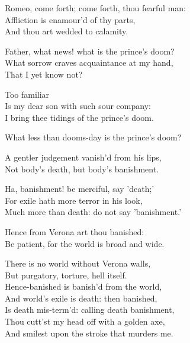  
\begin{speech}
Romeo, come forth; come forth, thou fearful man:
\\
Affliction is enamour'd of thy parts, \\
And thou art wedded to calamity.  \\
\end{speech}
\begin{speech}
Father, what news! what is the prince's doom? \\
What sorrow craves acquaintance at my hand, \\
That I yet know not? \\
\end{speech}
\begin{speech}
Too familiar \\
Is my dear son with such sour company: \\
I bring thee tidings of the prince's doom. \\
\end{speech}
\begin{speech}
What less than dooms-day is the prince's doom? \\

\end{speech}
\begin{speech}
A gentler judgement vanish'd from his lips, \\

Not body's death, but body's banishment. \\
\end{speech}
\begin{speech}
Ha, banishment! be merciful, say 'death;' \\
For exile hath more terror in his look, \\
Much more than death: do not say 'banishment.' \\
\end{speech}
\begin{speech}
Hence from Verona art thou banished: \\
Be patient, for the world is broad and wide. \\
\end{speech}
\begin{speech}
There is no world without Verona walls, \\
But purgatory, torture, hell itself. \\
Hence-banished is banish'd from the world, \\
And world's exile is death: then banished, \\
Is death mis-term'd: calling death banishment, \\
Thou cutt'st my head off with a golden axe, \\
And smilest upon the stroke that murders me. \\
\end{speech}
